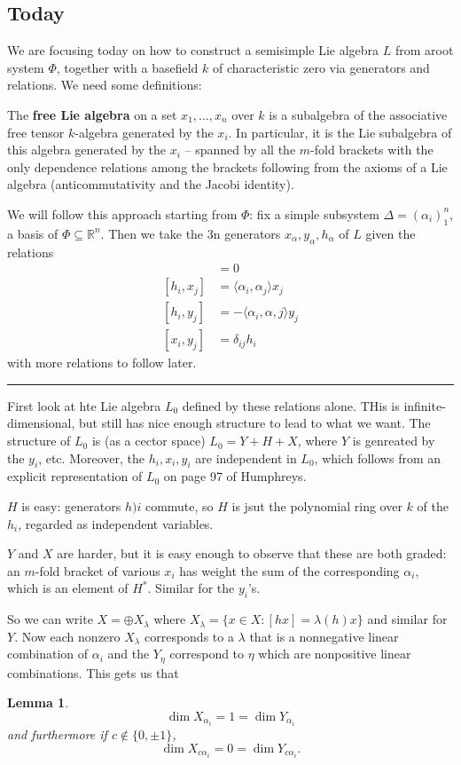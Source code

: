 \documentclass[12pt]{article}
\theoremstyle{nonumberbreak}
\theoremstyle{changebreak}
\newtheorem{lem}[thm]{Lemma}
\theoremstyle{nonumberbreak}
\theoremstyle{change}
\newcommand*{\R}{
\mathbb{R}
}
\newcommand*{\brk}{
\rule{2in}{.1pt}
}
\begin{document}
\subsection{Today}
We are focusing today on how to construct a semisimple Lie algebra $L$ from aroot system $\Phi$, together with a basefield $k$ of characteristic zero via generators and relations. We need some definitions:
\begin{defn}
	The \textbf{free Lie algebra} on a set $x_1,\dots,x_n$ over $k$ is a subalgebra of the associative free tensor $k$-algebra
	generated by the $x_i$. In particular, it is the Lie subalgebra of this algebra generated by the $x_i$ -- spanned by all the $m$-fold brackets
	with the only dependence relations among the brackets following from the axioms of a Lie algebra (anticommutativity and the Jacobi 
	identity).
\end{defn}

We will follow this approach starting from $\Phi$: fix a simple subsystem $\Delta=(\alpha_i)_1^n$, a basis of $\Phi\subseteq\R^n$.
Then we take the 3n generators $x_\alpha,y_\alpha,h_\alpha$ of $L$ given the relations
\begin{align*}
	[h_i,h_j]&=0\\
	[h_i,x_j]&=\langle \alpha_i,\alpha_j\rangle x_j\\
	[h_i,y_j]&=-\langle\alpha_i,\alpha,j\rangle y_j\\
	[x_i,y_j]&=\delta_{ij}h_i
\end{align*}
with more relations to follow later.

\brk

First look at hte Lie algebra $L_0$ defined by these relations alone. THis is infinite-dimensional, but still has nice enough structure to lead to what we want.
The structure of $L_0$ is (as a cector space) $L_0=Y+H+X$, where $Y$ is genreated by the $y_i$, etc. Moreover, the $h_i,x_i,y_i$ are independent in $L_0$,
which follows from an explicit representation of $L_0$ on page 97 of Humphreys.

$H$ is easy: generators $h)i$ commute, so $H$ is jsut the polynomial ring over $k$ of the $h_i$, regarded as independent variables.

$Y$ and $X$ are harder, but it is easy enough to observe that these are both graded: an $m$-fold bracket of various
$x_i$ has weight the sum of the corresponding $\alpha_i$, which is an element of $H^*$. Similar for the $y_i$'s.

So we can write $X=\oplus X_\lambda$ where $X_\lambda=\{x\in X:[hx]=\lambda(h)x\}$ and similar for $Y$. Now each nonzero $X_\lambda$ corresponds to a $\lambda$ 
that is a nonnegative linear combination of $\alpha_i$ and the $Y_\eta$ correspond to $\eta$ which are 
nonpositive linear combinations. This gets us that
\begin{lem}
	\[\dim X_{\alpha_i}=1=\dim Y_{\alpha_i}\]
	and furthermore if $c\notin\{0,\pm 1\}$,
	\[\dim X_{c\alpha_i}=0=\dim Y_{c\alpha_i}.\]
\end{lem}
\end{document}
